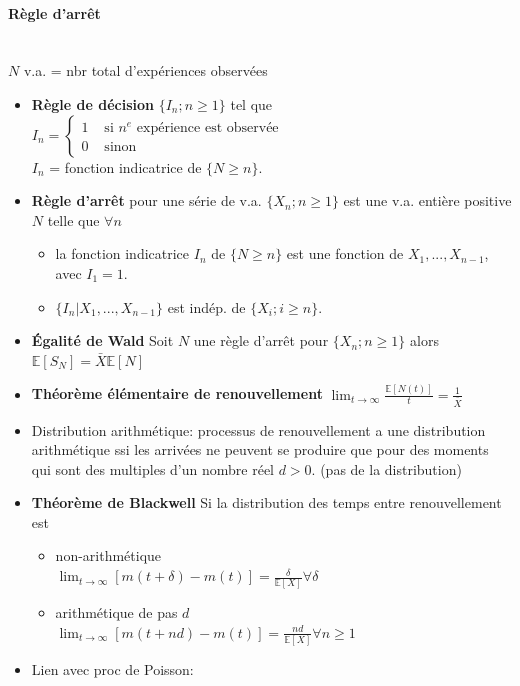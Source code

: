 \documentclass[paper=a4,fontsize=8pt,pagesize,DIV=calc]{scrartcl}
\begin{document}
\begin{multicols}{3}
\paragraph{Règle d'arrêt}~~\\
$N$ v.a. = nbr total d’expériences observées
\begin{itemize}
\item \textbf{Règle de décision} $\{I_n; n \geq 1\}$ tel que 
\\$I_n = \begin{cases} 1 & \text{ si $n^e$ expérience est observée}\\0 &\text{ sinon} \end{cases}$
\\$I_n$ = fonction indicatrice de $\{N \geq n\}$.
\item \textbf{Règle d’arrêt} pour une série de v.a. $\{X_n; n \geq 1\}$ est une v.a. entière positive $N$ telle que $\forall n$
\begin{itemize}
\item la fonction indicatrice $  I_n$ de $\{N \geq n\}$ est une fonction de $X_1, ... ,X_{n-1}$, avec $I_1 = 1$.
\item $\{I_n|X_1, ...,X_{n-1}\}$ est indép. de $\{X_i; i \geq  n\}$.
\end{itemize}
\item \textbf{Égalité de Wald} Soit $N$ une règle d’arrêt pour $\{X_n; n \geq 1\}$ alors
$\mathbb{E}[S_N] = \bar{X} \mathbb{E}[N]$
\item \textbf{Théorème élémentaire de renouvellement} $\lim_{t\to\infty}\frac{\mathbb{E}[N(t)]}{t}=\frac{1}{\bar{X}}$
\item Distribution arithmétique: processus de renouvellement a une distribution arithmétique ssi les arrivées ne peuvent se produire que pour des moments qui sont des multiples d’un nombre réel $d > 0$. (pas de la distribution)
\item \textbf{Théorème de Blackwell} Si la distribution des temps entre renouvellement est
\begin{itemize}
\item  non-arithmétique
\\$\lim_{t\to\infty}[m(t + \delta) - m(t)] =
\frac{\delta}{\mathbb{E}[X]} \forall \delta$
\item arithmétique de pas $d$
\\$\lim_{t\to\infty}[m(t + nd) - m(t)] =
\frac{nd}{\mathbb{E}[X]} \forall n\geq 1$
\end{itemize}
\item Lien avec proc de Poisson: 

\end{itemize}
\end{multicols}
\end{document}
